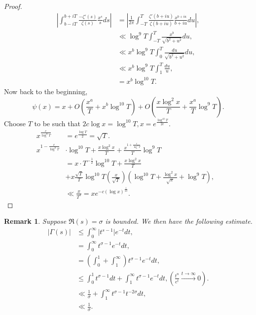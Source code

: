 \documentclass{article}
\newtheorem{remark}{Remark}[section]
\begin{document}
\begin{proof}
\begin{align*}
  \left\vert\int_{b-iT}^{b+iT}{\frac {-\zeta'(s)} {\zeta(s)}}{\frac {x^s} {s}}ds\right\vert & = \left\vert{\frac 1 {2\pi}}\int_{-T}^T{\frac {\zeta'(b+iu)} {\zeta(b+iu)}}{\frac {x^{b+iu}} {b+iu}}du\right\vert,\\
  & \ll  \log^9T\int_{-T}^T{\frac {x^b} {\sqrt{b^2+u^2}}}du,\\
  &\ll  x^b\log^9T\int_{0}^T{\frac {du} {\sqrt{b^2+u^2}}}du,\\
  & \ll  x^b\log^9T\int_1^T{\frac {du} u},\\
  & = x^b\log^{10}T.
\end{align*}
Now back to the beginning,
\begin{equation*}
  \psi(x) = x+O\left({\frac {x^a} {T}}+x^b\log^{10}T\right)+O\left({\frac {x\log^2x} T}+{\frac {x^a} T}\log^9T\right).
\end{equation*}
Choose $T$ to be such that $2c\log x = \log^{10}T,x=e^{{\frac {\log^{10}T} {2c}}}$.
\begin{align*}
  x^{{\frac c {\log^9T}}}&=e^{{\frac {\log T} 2}}  = \sqrt{T}.\\
  x^{1-{\frac c {\log^9 T}}}&\cdot\log^{10}T+{\frac {x\log^2 x} T}+{\frac {x^{1+{\frac c {\log^{9}T}}}} {T}}\log^9T&\\
  & = x\cdot T^{-{\frac 1 2}}\log^{10} T+{\frac {x\log^2 x} T}\\
  &+x{\frac {\sqrt{T}} T}\log^{10}T\left({\frac x {\sqrt{T}}}\right)(\log^{10}T + {\frac {\log^2x}{\sqrt{x}}}+\log^9T),\\
  &\ll {\frac x {T^s}}=xe^{-c(\log x)^{{\frac 1 {10}}}}.
\end{align*}
  \end{proof}
\begin{remark}
  Suppose $\Re(s) = \sigma$ is bounded. We then have the following estimate.
  \begin{align*}
    \vert\Gamma(s)\vert &\leq \int_0^\infty \vert t^{s-1}\vert e^{-t}dt,\\
    & = \int_0^\infty t^{\sigma-1}e^{-t}dt,\\
    & = \left(\int_0^1+\int_1^\infty\right)t^{\sigma-1}e^{-t}dt,\\
    &\leq \int_0^1t^{\sigma-1}dt + \int_1^\infty t^{\sigma-1}e^{-t}dt, \left({\frac {t^n} {e^t}}\stackrel{t\to\infty}{\to}0\right).\\
    &\ll  {\frac 1 \sigma}+\int_1^\infty t^{\sigma-1}t^{-2\sigma}dt,\\
    &\ll  {\frac 1 \sigma}.
  \end{align*}
  \label{remark_bound_gamma}
\end{remark}
\end{document}
